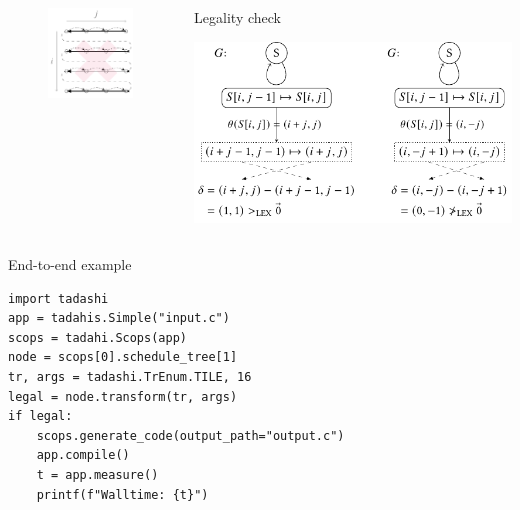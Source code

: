 \documentclass[presentation, aspectratio=169]{beamer}
\begin{document}
\begin{frame}[label={sec:orge1560a3}]{}
\begin{columns}
\begin{column}{0.45\columnwidth}
\begin{figure}
  {\includegraphics[width=0.48\linewidth]{figs/schedule-i-mj}}
  \label{fig:schedules}
\end{figure}
\end{column}
\begin{column}{0.52\columnwidth}
\begin{block}{Legality check}
\begin{center}
\includegraphics[width=\linewidth]{./figs/legality.pdf}
\end{center}
\end{block}
\end{column}
\end{columns}
\end{frame}
\begin{frame}[label={sec:org3da4216},fragile]{End-to-end example}
 \begin{verbatim}
import tadashi
app = tadahis.Simple("input.c")
scops = tadahi.Scops(app)
node = scops[0].schedule_tree[1]
tr, args = tadashi.TrEnum.TILE, 16
legal = node.transform(tr, args)
if legal:
    scops.generate_code(output_path="output.c")
    app.compile()
    t = app.measure()
    printf(f"Walltime: {t}")
\end{verbatim}
\end{frame}
\end{document}
